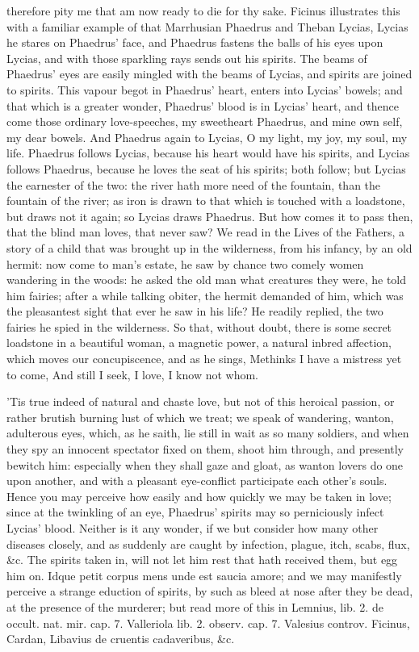 {therefore pity me that am now ready to die for thy sake. Ficinus
illustrates this with a familiar example of that Marrhusian Phaedrus
and Theban Lycias, Lycias he stares on Phaedrus' face, and
Phaedrus fastens the balls of his eyes upon Lycias, and with those
sparkling rays sends out his spirits. The beams of Phaedrus' eyes are
easily mingled with the beams of Lycias, and spirits are joined to
spirits. This vapour begot in Phaedrus' heart, enters into Lycias'
bowels; and that which is a greater wonder, Phaedrus' blood is in
Lycias' heart, and thence come those ordinary love-speeches, my
sweetheart Phaedrus, and mine own self, my dear bowels. And Phaedrus
again to Lycias, O my light, my joy, my soul, my life. Phaedrus follows
Lycias, because his heart would have his spirits, and Lycias follows
Phaedrus, because he loves the seat of his spirits; both follow; but
Lycias the earnester of the two: the river hath more need of the
fountain, than the fountain of the river; as iron is drawn to that
which is touched with a loadstone, but draws not it again; so Lycias
draws Phaedrus. But how comes it to pass then, that the blind man
loves, that never saw? We read in the Lives of the Fathers, a story of
a child that was brought up in the wilderness, from his infancy, by an
old hermit: now come to man's estate, he saw by chance two comely women
wandering in the woods: he asked the old man what creatures they were,
he told him fairies; after a while talking obiter, the hermit demanded
of him, which was the pleasantest sight that ever he saw in his life?
He readily replied, the two fairies he spied in the wilderness.
So that, without doubt, there is some secret loadstone in a beautiful
woman, a magnetic power, a natural inbred affection, which moves our
concupiscence, and as he sings,
Methinks I have a mistress yet to come,
And still I seek, I love, I know not whom.

'Tis true indeed of natural and chaste love, but not of this heroical
passion, or rather brutish burning lust of which we treat; we speak of
wandering, wanton, adulterous eyes, which, as he saith, lie still
in wait as so many soldiers, and when they spy an innocent spectator
fixed on them, shoot him through, and presently bewitch him: especially
when they shall gaze and gloat, as wanton lovers do one upon another,
and with a pleasant eye-conflict participate each other's souls. Hence
you may perceive how easily and how quickly we may be taken in love;
since at the twinkling of an eye, Phaedrus' spirits may so perniciously
infect Lycias' blood. Neither is it any wonder, if we but
consider how many other diseases closely, and as suddenly are caught by
infection, plague, itch, scabs, flux, \&c. The spirits taken in, will
not let him rest that hath received them, but egg him on. Idque
petit corpus mens unde est saucia amore; and we may manifestly perceive
a strange eduction of spirits, by such as bleed at nose after they be
dead, at the presence of the murderer; but read more of this in
Lemnius, lib. 2. de occult. nat. mir. cap. 7. Valleriola lib. 2.
observ. cap. 7. Valesius controv. Ficinus, Cardan, Libavius de cruentis
cadaveribus, \&c.

}
